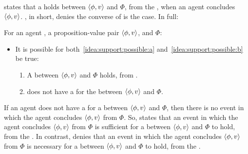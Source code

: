 \begin{note}
  \supportI{} states that a \ros{} holds between \(\langle \phi, v \rangle\) and \(\Phi\), from the \agpe{}, when an agent concludes \(\langle \phi, v \rangle\).
  \supportII{}, in short, denies the converse of \supportI{} is the case.
  In full:

  \begin{idea}[\supportII{}]
    \label{idea:support:possible}
    For an agent \vAgent{}, a proposition-value pair \(\langle \phi, v \rangle\), and \poP{} \(\Phi\):

    \begin{itemize}
    \item
      It is possible for both~\ref{idea:support:possible:a} and~\ref{idea:support:possible:b} be true:
      \begin{enumerate}[label=\alph*., ref=(\alph*)]
      \item
        \label{idea:support:possible:a}
        A \ros{} between \(\langle \phi, v \rangle\) and \(\Phi\) holds, from .
      \item
        \label{idea:support:possible:b}
        \vAgent{} does not have a \wit{} for the \ros{} between \(\langle \phi, v \rangle\) and \(\Phi\).
      \end{enumerate}
    \end{itemize}
    \vspace{-\baselineskip}
  \end{idea}

  If an agent does not have a \wit{} for a \ros{} between \(\langle \phi, v \rangle\) and \(\Phi\), then there is no event in which the agent concludes \(\langle \phi, v \rangle\) from \(\Phi\).
  So, \supportI{} states that an event in which the agent concludes \(\langle \phi, v \rangle\) from \(\Phi\) is sufficient for a \ros{} between \(\langle \phi, v \rangle\) and \(\Phi\) to hold, from the \agpe{}.
  In contrast, \supportII{} denies that an event in which the agent concludes \(\langle \phi, v \rangle\) from \(\Phi\) is necessary for a \ros{} between \(\langle \phi, v \rangle\) and \(\Phi\) to hold, from the \agpe{}.
\end{note}

